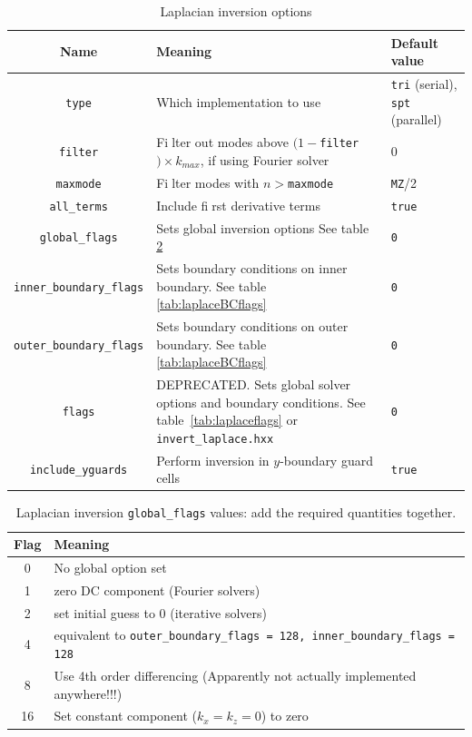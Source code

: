 \documentclass[12pt]{article}
\newcommand{\code}[1]{\texttt{#1}}
\begin{document}
\begin{table}
\caption{Laplacian inversion options}
\label{tab:laplacesettings}
\centering
\begin{tabular}[c]{c | p{8cm} | p{2.5cm}}
\hline
Name & Meaning & Default value\\
\hline
\code{type} & Which implementation to use & \code{tri} (serial),  \code{spt} (parallel) \\
\code{filter} & Fi􏰀lter out modes above $(1-$\code{filter}$)\times k_{max}$, if using Fourier solver & 0\\
\code{maxmode} & Fi􏰀lter modes with $n >$\code{maxmode} & \code{MZ}/2 \\
\code{all\_terms} & Include fi􏰀rst derivative terms & \code{true}\\
\code{global\_flags} & Sets global inversion options See table \ref{tab:laplaceglobalflags}& \code{0}\\
\code{inner\_boundary\_flags} & Sets boundary conditions on inner boundary.  See table \ref{tab:laplaceBCflags} & \code{0}\\
\code{outer\_boundary\_flags} & Sets boundary conditions on outer boundary.  See table \ref{tab:laplaceBCflags}& \code{0}\\
\code{flags} & DEPRECATED. Sets global solver options and boundary conditions.  See table~\ref{tab:laplaceflags} or \code{invert\_laplace.hxx} & \code{0} \\
\code{include\_yguards} & Perform inversion in $y$-boundary guard
cells & \code{true}\\
\hline
\end{tabular}
\end{table}

\begin{table}
\caption{Laplacian inversion \code{global\_flags} values: add the required quantities together.}
\label{tab:laplaceglobalflags}
\centering
\begin{tabular}[c]{c|l}
\hline
Flag & Meaning \\
\hline
0 &  No global option set \\
1 &  zero DC component (Fourier solvers) \\
2 &  set initial guess to 0 (iterative solvers) \\
4 &  equivalent to \code{outer\_boundary\_flags = 128, inner\_boundary\_flags = 128}\\
8 & Use 4th order differencing (Apparently not actually implemented anywhere!!!) \\
16 & Set constant component ($k_x = k_z = 0$) to zero \\
\hline
\end{tabular}
\end{table}
\end{document}
